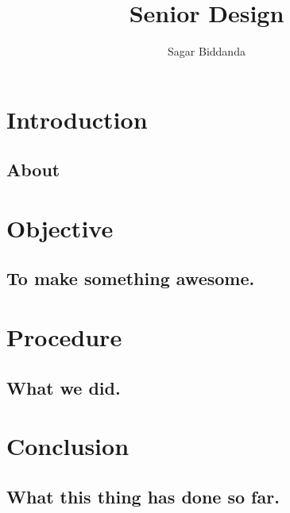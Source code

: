 \documentclass[a4paper,11pt]{report}
\begin{document}
	\author{Sagar Biddanda}
	\title{Senior Design}
	\maketitle
	 \tableofcontents \newpage {}

	\chapter{Introduction}
		\section{About}
	\chapter{Objective}
		\section{To make something awesome.}
	\chapter{Procedure}
		\section{What we did.}
	\chapter{Conclusion}
		\section{What this thing has done so far.}
\end{document}
